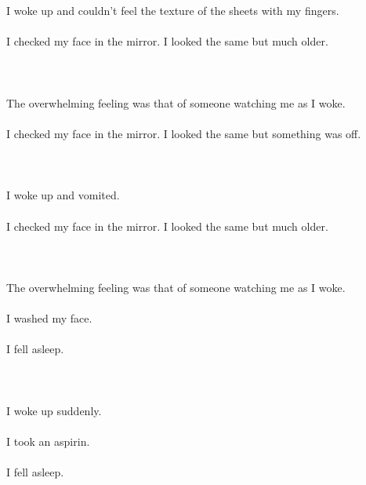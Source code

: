 \documentclass{article}
\begin{document}
    
    \section{}
    I woke up and couldn't feel the texture of the sheets with my fingers.\\\\I checked my face in the mirror. I looked the same but much older.\\\\
    \newpage
    
    \section{}
    The overwhelming feeling was that of someone watching me as I woke.\\\\I checked my face in the mirror. I looked the same but something was off.\\\\
    \newpage
    
    \section{}
    I woke up and vomited.\\\\I checked my face in the mirror. I looked the same but much older.\\\\
    \newpage
    
    \section{}
    The overwhelming feeling was that of someone watching me as I woke.\\\\I washed my face.\\\\I fell asleep.\\\\
    \newpage
    
    \section{}
    I woke up suddenly.\\\\I took an aspirin.\\\\I fell asleep.\\\\
    \newpage
    
\end{document}
